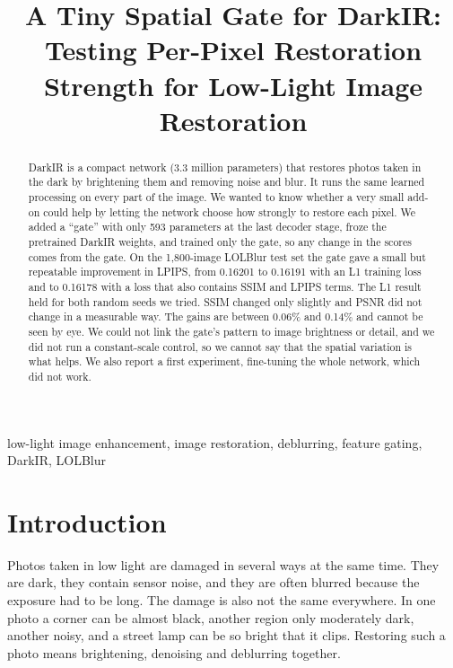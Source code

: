 \documentclass[conference]{IEEEtran}
\begin{document}
\title{A Tiny Spatial Gate for DarkIR: Testing Per-Pixel Restoration Strength for Low-Light Image Restoration}

\author{
\and
{}
}

\maketitle

\begin{abstract}
DarkIR is a compact network (3.3 million parameters) that restores photos taken in the dark by brightening them and removing noise and blur. It runs the same learned processing on every part of the image. We wanted to know whether a very small add-on could help by letting the network choose how strongly to restore each pixel. We added a ``gate'' with only 593 parameters at the last decoder stage, froze the pretrained DarkIR weights, and trained only the gate, so any change in the scores comes from the gate. On the 1{,}800-image LOLBlur test set the gate gave a small but repeatable improvement in LPIPS, from 0.16201 to 0.16191 with an L1 training loss and to 0.16178 with a loss that also contains SSIM and LPIPS terms. The L1 result held for both random seeds we tried. SSIM changed only slightly and PSNR did not change in a measurable way. The gains are between 0.06\% and 0.14\% and cannot be seen by eye. We could not link the gate's pattern to image brightness or detail, and we did not run a constant-scale control, so we cannot say that the spatial variation is what helps. We also report a first experiment, fine-tuning the whole network, which did not work.
\end{abstract}

\begin{IEEEkeywords}
low-light image enhancement, image restoration, deblurring, feature gating, DarkIR, LOLBlur
\end{IEEEkeywords}

\section{Introduction}
Photos taken in low light are damaged in several ways at the same time. They are dark, they contain sensor noise, and they are often blurred because the exposure had to be long. The damage is also not the same everywhere. In one photo a corner can be almost black, another region only moderately dark, another noisy, and a street lamp can be so bright that it clips. Restoring such a photo means brightening, denoising and deblurring together.
\end{document}
